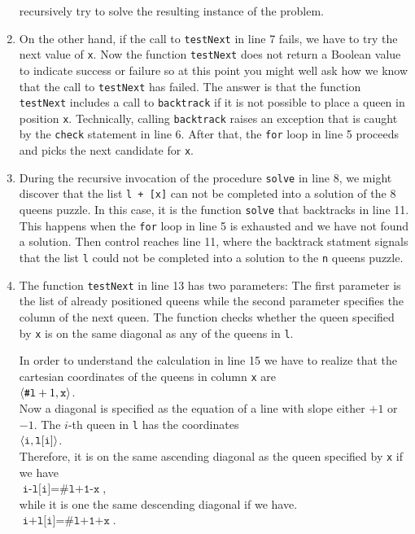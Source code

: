 \begin{enumerate}
      recursively try to solve the resulting instance of the problem.
\item On the other hand, if the call to \texttt{testNext} in line 7 fails, we have to try
      the next value of \texttt{x}.  Now the function \texttt{testNext} does not return a 
      Boolean value to indicate success or failure so at this point you might well
      ask how we know that the call to \texttt{testNext} has failed.  The answer is that the function
      \texttt{testNext} includes a call to \texttt{backtrack} if it is not possible to
      place a queen in position \texttt{x}.  Technically, calling \texttt{backtrack}
      raises an exception that is caught by the \texttt{check} statement in line 6.
      After that,  the \texttt{for} loop in line 5 proceeds and picks the next
      candidate for \texttt{x}.
\item During the recursive invocation of the procedure \texttt{solve} in line 8, we might
      discover that the list \texttt{l + [x]} can not be completed into a solution of the 8
      queens puzzle.   In this case, it is the function \texttt{solve} that backtracks
      in line 11.  This happens when the \texttt{for} loop in line 5 is exhausted and we
      have not found a solution.  Then
      control  reaches line 11, where the backtrack statment  signals that the list \texttt{l}
      could not be completed into a solution to the \texttt{n} queens puzzle.
\item The function \texttt{testNext} in line 13 has two parameters:  The first parameter is the list
      of already positioned queens while the second parameter specifies the column of the next
      queen.  The function checks whether the queen specified by \texttt{x} is on the same
      diagonal as any of the queens in \texttt{l}.
      
      In order to understand the calculation in line 15 we have to realize that the
      cartesian coordinates of the queens in column \texttt{x} are 
      \\[0.2cm]
      \hspace*{1.3cm}
      $\pair(\texttt{\#l}+1, \mathtt{x})$.
      \\[0.2cm]
      Now a diagonal is specified as the equation of a line with slope either $+1$ or $-1$.
      The $i$-th  queen in \texttt{l} has the coordinates
      \\[0.2cm]
      \hspace*{1.3cm}
      $\pair(\texttt{i}, \mathtt{l[i]})$.      
      \\[0.2cm]
      Therefore, it is on the same ascending diagonal as the queen specified by \texttt{x} if
      we have
      \\[0.2cm]
      \hspace*{1.3cm}
      $\texttt{i-l[i]} = \texttt{\#l+1-x}$,
      \\[0.2cm]
      while it is one the same descending diagonal if we have.
      \\[0.2cm]
      \hspace*{1.3cm}
      $\texttt{i+l[i]} = \texttt{\#l+1+x}$.
\end{enumerate}

